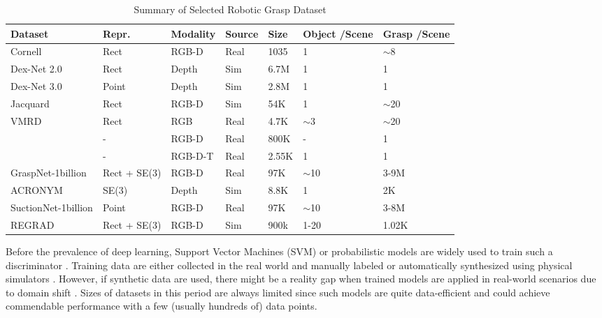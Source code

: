 \documentclass[letterpaper,10pt]{article}
\begin{document}
\begin{table}[t]
\caption{Summary of Selected Robotic Grasp Dataset}
\label{table:dataset}
\begin{center}
\begin{tabularx}{1\columnwidth}{m{5.5cm}m{2cm}<{\centering}m{1.5cm}<{\centering}m{1cm}<{\centering}m{1cm}<{\centering}m{1.1cm}<{\centering}m{1cm}<{\centering}}
\toprule
 \bf Dataset & \bf Repr. & \bf Modality & \bf Source & \bf Size &\bf Object /Scene & \bf Grasp /Scene \\
\midrule
Cornell \cite{jiang2011efficient}  & Rect & RGB-D & Real & 1035 & 1 & $\sim$8 \\
Dex-Net 2.0 \cite{mahler2017dex} & Rect & Depth & Sim & 6.7M & 1 & 1 \\
Dex-Net 3.0 \cite{mahler2018dex} & Point & Depth & Sim & 2.8M & 1 & 1 \\
Jacquard \cite{depierre2018jacquard} & Rect & RGB-D & Sim & 54K & 1 & $\sim$20 \\
VMRD \cite{zhang2018visual} & Rect & RGB & Real & 4.7K & $\sim$3 & $\sim$20\\
\cite{levine2018learning} & - & RGB-D & Real & 800K & - & 1\\
\cite{wang2019multimodal} & - & RGB-D-T & Real & 2.55K & 1 & 1 \\
GraspNet-1billion \cite{fang2020graspnet} & Rect + SE(3) & RGB-D & Real & 97K & $\sim$10 & 3-9M\\
ACRONYM \cite{eppner2021acronym} & SE(3) & Depth & Sim & 8.8K & 1 & 2K \\
SuctionNet-1billion \cite{cao2021suctionnet} & Point & RGB-D & Real & 97K & $\sim$10 & 3-8M\\
REGRAD \cite{zhang2022regrad} & Rect + SE(3) & RGB-D & Sim & 900k & 1-20 & 1.02K\\
\bottomrule
\end{tabularx}
\end{center}
\end{table}



Before the prevalence of deep learning, Support Vector Machines (SVM) \cite{cortes1995support} or probabilistic models \cite{koller2009probabilistic} are widely used to train such a discriminator \cite{pelossof2004svm, saxena2006robotic, saxena2008robotic, bohg2009grasping, le2010learning, bohg2010learning, bekiroglu2011assessing, jiang2011efficient, schill2012learning, dang2012learning}.
Training data are either collected in the real world and manually labeled \cite{jiang2011efficient, schill2012learning} or automatically synthesized using physical simulators \cite{pelossof2004svm, saxena2006robotic, saxena2008robotic, bekiroglu2011assessing, goldfeder2009columbia}.
However, if synthetic data are used, there might be a reality gap when trained models are applied in real-world scenarios due to domain shift \cite{wang2018deep}.
Sizes of datasets in this period are always limited since such models are quite data-efficient and could achieve commendable performance with a few (usually hundreds of) data points.
\end{document}
